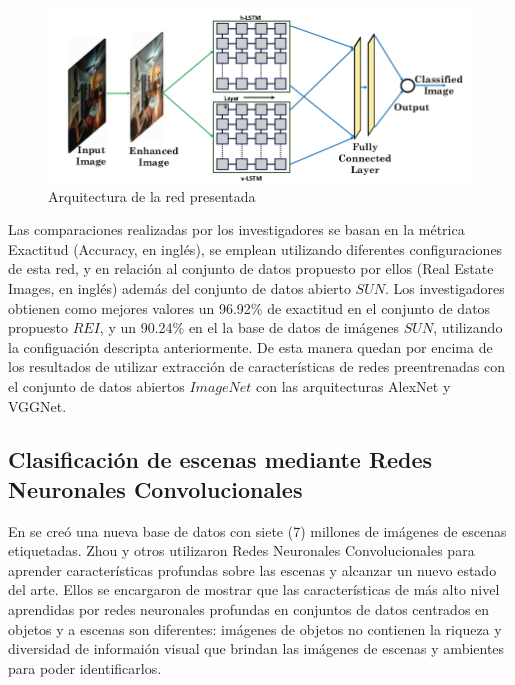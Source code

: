 \begin{figure}[h]
	\centering
	\includegraphics[width=1\linewidth,height=0.3\textheight]{images/lstm_architecture}
	\caption[Arquitectura de la red presentada]{Arquitectura de la red presentada}
	\label{fig:lstmarchitecture}
\end{figure}

Las comparaciones realizadas por los investigadores se basan en la métrica Exactitud (Accuracy, en inglés), se emplean utilizando diferentes configuraciones de esta red, y en relación al conjunto de datos propuesto por ellos (Real Estate Images, en inglés) además del conjunto de datos abierto \(SUN\). Los investigadores obtienen como mejores valores un 96.92\% de exactitud en el conjunto de datos propuesto \(REI\), y un 90.24\% en el la base de datos de imágenes \(SUN\), utilizando la configuación descripta anteriormente.
De esta manera quedan por encima de los resultados de utilizar extracción de características de redes preentrenadas con el conjunto de datos abiertos \(ImageNet\) con las arquitecturas AlexNet y VGGNet.

 

\subsection{Clasificación de escenas mediante Redes Neuronales Convolucionales}


En \cite{learning_deep_features} se creó una nueva base de datos con siete (7) millones de imágenes de escenas etiquetadas. Zhou y otros utilizaron Redes Neuronales Convolucionales para aprender características profundas sobre las escenas y alcanzar un nuevo estado del arte. Ellos se encargaron de mostrar que las características de más alto nivel aprendidas por redes neuronales profundas en conjuntos de datos centrados en objetos y a escenas son diferentes: imágenes de objetos no contienen la riqueza y diversidad de informaión visual que brindan las imágenes de escenas y ambientes para poder identificarlos.

